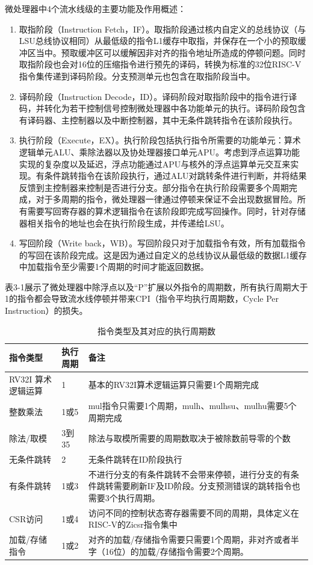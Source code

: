 微处理器中4个流水线级的主要功能及作用概述：

\begin{enumerate}
	\item 取指阶段（Instruction Fetch，IF）。取指阶段通过核内自定义的总线协议（与LSU总线协议相同）从最低级的指令L1缓存中取指，并保存在一个小的预取缓冲区当中。预取缓冲区可以缓解因非对齐的指令地址所造成的停顿问题。同时取指阶段也会对16位的压缩指令进行预先的译码，转换为标准的32位RISC-V指令集传递到译码阶段。分支预测单元也包含在取指阶段当中。
	\item 译码阶段（Instruction Decode，ID）。译码阶段对取指阶段中的指令进行译码，并转化为若干控制信号控制微处理器中各功能单元的执行。译码阶段包含有译码器、主控制器以及中断控制器，其中无条件跳转指令在该阶段执行。
	\item 执行阶段（Execute，EX）。执行阶段包括执行指令所需要的功能单元：算术逻辑单元ALU、乘除法器以及协处理器接口单元APU。考虑到浮点运算功能实现的复杂度以及延迟，浮点功能通过APU与核外的浮点运算单元交互来实现。有条件跳转指令在该阶段执行，通过ALU对跳转条件进行判断，并将结果反馈到主控制器来控制是否进行分支。部分指令在执行阶段需要多个周期完成，对于多周期的指令，微处理器一律通过停顿来保证不会出现数据冒险。所有需要写回寄存器的算术逻辑指令在该阶段即完成写回操作。同时，针对存储器相关指令的地址也会在执行阶段生成，并传递给LSU。
	\item 写回阶段（Write back，WB）。写回阶段只对于加载指令有效，所有加载指令的写回在该阶段完成。这是因为通过自定义的总线协议从最低级的数据L1缓存中加载指令至少需要1个周期的时间才能返回数据。
\end{enumerate}

表3-1展示了微处理器中除浮点以及“P”扩展以外指令的周期数，所有执行周期大于1的指令都会导致流水线停顿并带来CPI（指令平均执行周期数，Cycle Per Instruction）的损失。

\begin{table}
	\caption{指令类型及其对应的执行周期数}
	\centering
	\small 
	\begin{tabular}{p{80pt}p{50pt}p{200pt}}
		\hline 
		指令类型 & 执行周期                & 备注             \tabularnewline
		\hline 
		RV32I 算术逻辑运算   & 1		     & 基本的RV32I算术逻辑运算只需要1个周期完成 \tabularnewline
		整数乘法   & 1或5	     & mul指令只需要1个周期，mulh、mulhsu、mulhu需要5个周期完成 \tabularnewline
		除法/取模   & 3到35	     & 除法与取模所需要的周期数取决于被除数前导零的个数 \tabularnewline
		无条件跳转   & 2     & 无条件跳转在ID阶段执行 \tabularnewline
		有条件跳转   & 1或3     & 不进行分支的有条件跳转不会带来停顿，进行分支的有条件跳转需要刷新IF及ID阶段。分支预测错误的跳转指令也需要3个执行周期。 \tabularnewline
		CSR访问   & 1或4     & 访问不同的控制状态寄存器需要不同的周期，具体定义在RISC-V的Zicsr指令集中 \tabularnewline
		加载/存储指令   & 1或2     & 对齐的加载/存储指令需要只需要1个周期，非对齐或者半字（16位）的加载/存储指令需要2个周期。 \tabularnewline
		\hline 
	\end{tabular}
\end{table}

